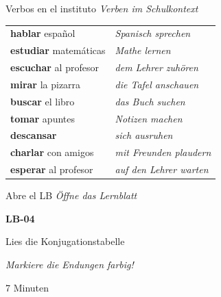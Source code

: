 \documentclass[aspectratio=169, 11pt]{beamer}
\newcommand{\seriftext}[1]{{\fontfamily{ppl}\selectfont #1}}
\newcommand{\es}[1]{\seriftext{\textbf{#1}}}
\newcommand{\de}[1]{\textit{\textcolor{mittelgrau}{#1}}}
\newcommand{\zeit}[1]{{\small\textcolor{mittelgrau}{#1}}}
\begin{document}
\begin{frame}{Verbos en el instituto \de{Verben im Schulkontext}}
    \vspace{0.3cm}

    \renewcommand{\arraystretch}{1.5}
    \begin{tabular}{ll}
        \es{hablar} español & \de{Spanisch sprechen} \\
        \es{estudiar} matemáticas & \de{Mathe lernen} \\
        \es{escuchar} al profesor & \de{dem Lehrer zuhören} \\
        \es{mirar} la pizarra & \de{die Tafel anschauen} \\
        \es{buscar} el libro & \de{das Buch suchen} \\
        \es{tomar} apuntes & \de{Notizen machen} \\
        \es{descansar} & \de{sich ausruhen} \\
        \es{charlar} con amigos & \de{mit Freunden plaudern} \\
        \es{esperar} al profesor & \de{auf den Lehrer warten} \\
    \end{tabular}
\end{frame}

\begin{frame}{Abre el LB \de{Öffne das Lernblatt}}
    \vspace{1cm}

    \begin{center}
        {\Huge\es{LB-04}}

        \vspace{0.8cm}

        {\large Lies die Konjugationstabelle}

        \vspace{0.3cm}

        \de{Markiere die Endungen farbig!}

        \vspace{1cm}

        \zeit{7 Minuten}
    \end{center}
\end{frame}

\end{document}
